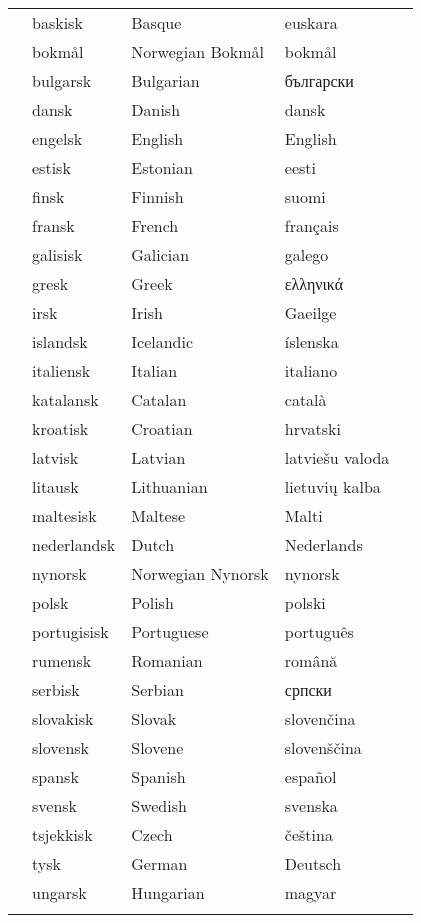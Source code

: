 \vspace*{-5mm}
\centering
  \setlength{\tabcolsep}{2em}
  \begin{tabularx}{\textwidth}{lllll} \toprule\addlinespace
  &baskisk & Basque & euskara& \\
  &bokmål & Norwegian Bokmål & bokmål& \\
  &bulgarsk & Bulgarian & български& \\
  &dansk & Danish & dansk& \\
  &engelsk & English & English& \\
  &estisk & Estonian & eesti& \\
  &finsk & Finnish & suomi& \\
  &fransk & French & français& \\
  &galisisk & Galician & galego& \\
  &gresk & Greek & ελληνικά& \\
  &irsk & Irish & Gaeilge& \\
  &islandsk & Icelandic & íslenska& \\
  &italiensk & Italian & italiano& \\
  &katalansk & Catalan & català& \\
  &kroatisk & Croatian & hrvatski& \\
  &latvisk & Latvian & latviešu valoda& \\
  &litausk & Lithuanian & lietuvių kalba& \\
  &maltesisk & Maltese & Malti& \\
  &nederlandsk & Dutch & Nederlands& \\
  &nynorsk & Norwegian Nynorsk & nynorsk& \\
  &polsk & Polish & polski& \\
  &portugisisk & Portuguese & português& \\
  &rumensk & Romanian & română& \\
  &serbisk & Serbian & српски& \\
  &slovakisk & Slovak & slovenčina& \\
  &slovensk & Slovene & slovenščina& \\
  &spansk & Spanish & español& \\
  &svensk & Swedish & svenska& \\
  &tsjekkisk & Czech & čeština& \\
  &tysk & German & Deutsch& \\
  &ungarsk & Hungarian & magyar& \\ \addlinespace \bottomrule
\end{tabularx}
